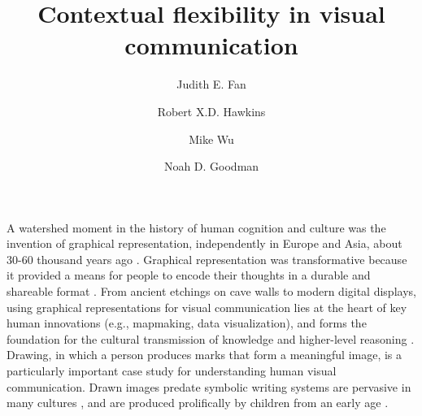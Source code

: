 \documentclass[9pt,twocolumn,twoside]{pnas-new}
\title{Contextual flexibility in visual communication}
\author[a,1]{Judith E. Fan}
\author[a]{Robert X.D. Hawkins}
\author[b]{Mike Wu}
\author[a,b]{Noah D. Goodman}
\affil[a]{Department of Psychology, Stanford University}
\affil[b]{Department of Computer Science, Stanford University}
\newcommand{\mwu}[1]{{\color{green}{[mwu: #1]}}}
\begin{document}
\verticaladjustment{-2pt}

\maketitle
\thispagestyle{firststyle}


A watershed moment in the history of human cognition and culture was the invention of graphical representation, independently in Europe and Asia, about 30-60 thousand years ago \cite{hoffmann2018u,Aubert:2014jy}. Graphical representation was transformative because it provided a means for people to encode their thoughts in a durable and shareable format \cite{donald1991origins}. From ancient etchings on cave walls to modern digital displays, using graphical representations for visual communication lies at the heart of key human innovations (e.g., mapmaking, data visualization), and forms the foundation for the cultural transmission of knowledge and higher-level reasoning \cite{tomasello2009cultural,card1999readings}. Drawing, in which a person produces marks that form a meaningful image, is a particularly important case study for understanding human visual communication. Drawn images \mwu{(that)} predate symbolic writing systems \cite{clottes2008cave} are pervasive in many cultures \cite{gombrich1989story}, and are produced prolifically by children from an early age \cite{kellogg1969analyzing}.
\end{document}
